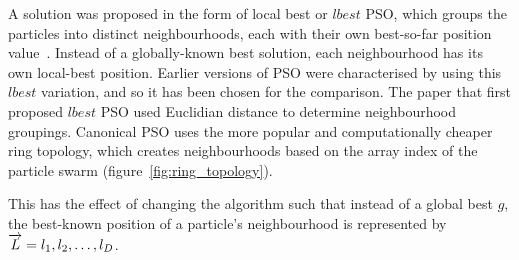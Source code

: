 \documentclass{csfourzero}
\newcommand{\rarrow}[1]{\overrightarrow{#1\vphantom{b}}}
\begin{document}
A solution was proposed in the form of local best or $lbest$ PSO, which groups
the particles into distinct neighbourhoods, each with their own best-so-far
position value~\cite{Suganthan:1999iv}. Instead of a globally-known best
solution, each neighbourhood has its own local-best position. Earlier versions
of PSO were characterised by using this $lbest$ variation, and so it has been
chosen for the comparison. The paper that first proposed $lbest$ PSO used
Euclidian distance to determine neighbourhood groupings.  Canonical PSO uses the
more popular and computationally cheaper ring topology, which creates
neighbourhoods based on the array index of the particle swarm
(figure~\ref{fig:ring_topology}).

This has the effect of changing the algorithm such that instead
of a global best $g$, the best-known position of a particle's neighbourhood is
represented by $\rarrow{L} = l_1, l_2,\ldots,l_D$.
\end{document}
